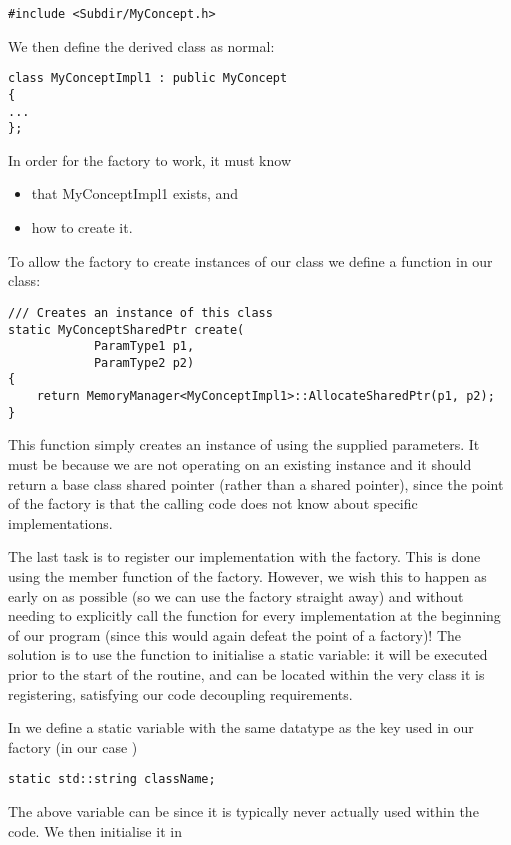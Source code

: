 \begin{lstlisting}[style=C++Style]
#include <Subdir/MyConcept.h>
\end{lstlisting}

We then define the derived class as normal:

\begin{lstlisting}[style=C++Style]
class MyConceptImpl1 : public MyConcept
{
...
};
\end{lstlisting}

In order for the factory to work, it must know
\begin{itemize}
\item that {{{MyConceptImpl1}}} exists, and
\item how to create it.
\end{itemize}

To allow the factory to create instances of our class we define a function in 
our class:
\begin{lstlisting}[style=C++Style]
/// Creates an instance of this class
static MyConceptSharedPtr create(
            ParamType1 p1,
            ParamType2 p2)
{
    return MemoryManager<MyConceptImpl1>::AllocateSharedPtr(p1, p2);
}
\end{lstlisting}
This function simply creates an instance of  using the
supplied parameters. It must be  because we are not operating on
an existing instance and it should return a base class shared pointer (rather 
than a  shared pointer), since the point of the factory
is that the calling code does not know about specific implementations.

The last task is to register our implementation with the factory. This is done 
using the  member function of the factory.
However, we wish this to happen as early on as possible (so we can use the 
factory straight away) and without needing to explicitly call the function for 
every implementation at the beginning of our program (since this would again 
defeat the point of a factory)! The solution is to use the function to 
initialise a static variable: it will be executed prior to the start of the
 routine, and can be located within the very class it is
registering, satisfying our code decoupling requirements.

In  we define a static variable with the same datatype
as the key used in our factory (in our case ) 
\begin{lstlisting}[style=C++Style]
static std::string className;
\end{lstlisting}
The above variable can be  since it is typically never actually
used within the code. We then initialise it in 


